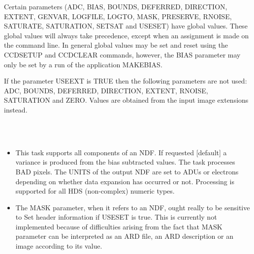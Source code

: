 \documentclass[twoside,11pt]{article}
\newcommand{\htmlref}[2]{#1}
\renewcommand{\_}{\texttt{\symbol{95}}}
\newcommand{\xroutine}[1]{\htmlref{{\sc #1}}{#1}}
\newcommand{\sstimplementationstatus}[1]{
   \item[{Implementation Status:}] \mbox{} \\[1.3ex] #1}
\newcommand{\sstitemlist}[1]{
  \mbox{} \\
  \vspace{-3.5ex}
  \begin{itemize}
     #1
  \end{itemize}
}
\newcommand{\sstitem}{\item}
\newcommand{\sstimplementationstatus}[1]{
      \item[Implementation Status:] #1
   }
\newcommand{\sstitemlist}[1]{
      \begin{itemize}
         #1
      \end{itemize}
      \\
   }
\newcommand{\sstitem}{\item}
\begin{document}
{{      Certain parameters (ADC, BIAS, BOUNDS, DEFERRED, DIRECTION,
      EXTENT, GENVAR, LOGFILE, LOGTO, MASK, PRESERVE, RNOISE, SATURATE,
      SATURATION, SETSAT and USESET) have global values. These global values
      will always take precedence, except when an assignment is made on
      the command line.  In general global values may be set and reset
      using the \xroutine{CCDSETUP} and \xroutine{CCDCLEAR} commands, however, the BIAS
      parameter may only be set by a run of the application \xroutine{MAKEBIAS}.

      If the parameter USEEXT is TRUE then the following parameters
      are not used: ADC, BOUNDS, DEFERRED, DIRECTION, EXTENT, RNOISE,
      SATURATION and ZERO. Values are obtained from the input image
      extensions instead.
   }
   \sstimplementationstatus{
      \sstitemlist{

         \sstitem
         This task supports all components of an NDF. If requested
           [default] a variance is produced from the bias subtracted
           values. The task processes BAD pixels. The UNITS of the output
           NDF are set to ADUs or electrons depending on whether data
           expansion has occurred or not. Processing is supported for all
           HDS (non-complex) numeric types.

        \sstitem
        The MASK parameter, when it refers to an NDF, ought really to
        be sensitive to Set header information if USESET is true.
        This is currently not implemented because of difficulties
        arising from the fact that MASK parameter can be interpreted
        as an ARD file, an ARD description or an image according to
        its value.
      }
   }
}
\end{document}
